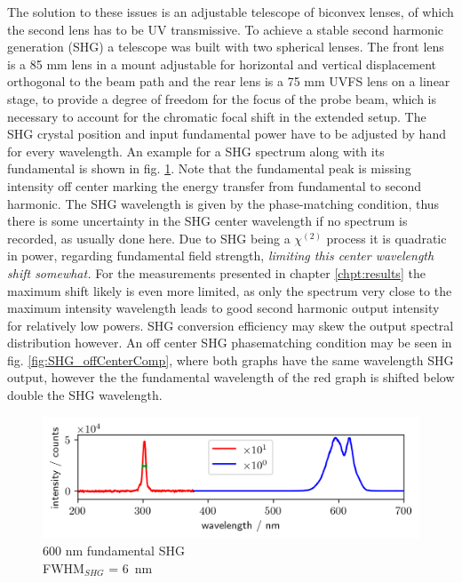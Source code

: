 \documentclass[twoside,openright]{scrreprt}
\begin{document}
The solution to these issues is an adjustable telescope of biconvex lenses, of which the second lens has to be UV transmissive. To achieve a stable second harmonic generation (SHG) a telescope was built with two spherical lenses. The front lens is a 85 mm lens in a mount adjustable for horizontal and vertical displacement orthogonal to the beam path and the rear lens is a 75 mm UVFS lens on a linear stage, to provide a degree of freedom for the focus of the probe beam, which is necessary to account for the chromatic focal shift in the extended setup. The SHG crystal position and input fundamental power have to be adjusted by hand for every wavelength. An example for a SHG spectrum along with its fundamental is shown in fig. \ref{fig:specSHG300nm}. Note that the fundamental peak is missing intensity off center marking the energy transfer from fundamental to second harmonic. The SHG wavelength is given by the phase-matching condition, thus there is some uncertainty in the SHG center wavelength if no spectrum is recorded, as usually done here. Due to SHG being a $\chi^{\left(2\right)}$ process it is quadratic in power, regarding fundamental field strength, \textit{limiting this center wavelength shift somewhat.} For the measurements presented in chapter \ref{chpt:results} the maximum shift likely is even more limited, as only the spectrum very close to the maximum intensity wavelength leads to good second harmonic output intensity for relatively low powers. SHG conversion efficiency may skew the output spectral distribution however. An off center SHG phasematching condition may be seen in fig. \ref{fig:SHG_offCenterComp}, where both graphs have the same wavelength SHG output, however the the fundamental wavelength of the red graph is shifted below double the SHG wavelength. 
\begin{figure}[hbtp]
\centering
\includegraphics[scale=1]{images/spectra/SpectrumExampleNoFilter_300nm.png}
\caption{600 nm fundamental SHG\label{fig:specSHG300nm}\\ FWHM$_{SHG}$ = \SI{6}{\nano\meter}}
\end{figure}
\end{document}
